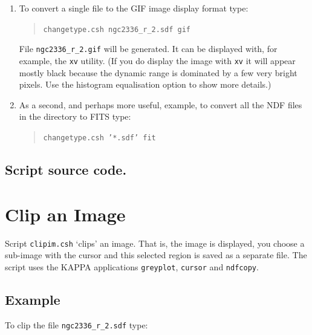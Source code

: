 \documentclass[twoside,11pt]{article}
\newcommand{\htmladdnormallink}[2]{#1}
\newcommand{\xref}[3]{#1}
\newcommand{\xlabel}[1]{}
\begin{document}
\begin{enumerate}

  \item To convert a single file to the GIF image display format type:

  \begin{quote}
   {\tt changetype.csh ngc2336\_r\_2.sdf gif}
  \end{quote}

   File {\tt ngc2336\_r\_2.gif} will be generated.  It can be displayed
   with, for example, the {\tt xv} utility.  (If you do display the image
   with {\tt xv} it will appear mostly black because the dynamic range
   is dominated by a few very bright pixels.  Use the histogram
   equalisation option to show more details.)

  \item As a second, and perhaps more useful, example, to convert all the
   NDF files in the directory to FITS type:

  \begin{quote}
   {\tt changetype.csh '*.sdf' fit}
  \end{quote}

\end{enumerate}

\begin{htmlonly}
\subsection*{\htmladdnormallink{Script source code.}{changetype.lis}}
\end{htmlonly}


\newpage
\section{\xlabel{CLIPIM}\label{CLIPIM}Clip an Image}

Script {\tt clipim.csh} `clips' an image.  That is, the image is
displayed, you choose a sub-image with the cursor and this selected
region is saved as a separate file.  The script uses the \xref{KAPPA}{sun95}{}
applications \xref{{\tt greyplot}}{sun95}{GREYPLOT},
\xref{{\tt cursor}}{sun95}{CURSOR} and \xref{{\tt ndfcopy}}{sun95}{NDFCOPY}.

\subsection*{Example}

To clip the file {\tt ngc2336\_r\_2.sdf} type:
\end{document}
